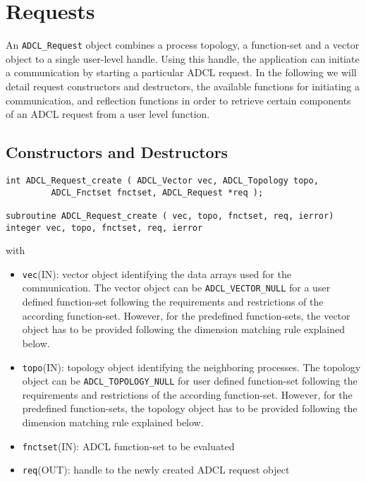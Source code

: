 \section{Requests}

An {\tt ADCL\_Request} object combines a process topology, a function-set and
a vector object to a single user-level handle. Using this handle, the
application can initiate a communication by starting a particular ADCL
request. In the following we will detail request constructors and destructors,
the available functions for initiating a communication, and reflection
functions in order to retrieve certain components of an ADCL request from a
user level function.

\subsection{Constructors and Destructors}

\begin{verbatim}
int ADCL_Request_create ( ADCL_Vector vec, ADCL_Topology topo, 
         ADCL_Fnctset fnctset, ADCL_Request *req );

subroutine ADCL_Request_create ( vec, topo, fnctset, req, ierror)
integer vec, topo, fnctset, req, ierror
\end{verbatim}
with
\begin{itemize}
\item {\tt vec}(IN): vector object identifying the data arrays used for the
  communication. The vector object can be {\tt ADCL\_VECTOR\_NULL} for a user
  defined function-set following the requirements and restrictions of the
  according function-set. However, for the predefined function-sets, the
  vector object has to be provided following the dimension matching rule
  explained below.
\item {\tt topo}(IN): topology object identifying the neighboring processes.
  The topology object can be {\tt ADCL\_TOPOLOGY\_NULL} for user defined
  function-set following the requirements and restrictions of the according
  function-set. However, for the predefined function-sets, the topology object
  has to be provided following the dimension matching rule explained below.
\item {\tt fnctset}(IN): ADCL function-set to be evaluated
\item {\tt req}(OUT): handle to the newly created ADCL request object
\end{itemize}
\hspace{1cm}

